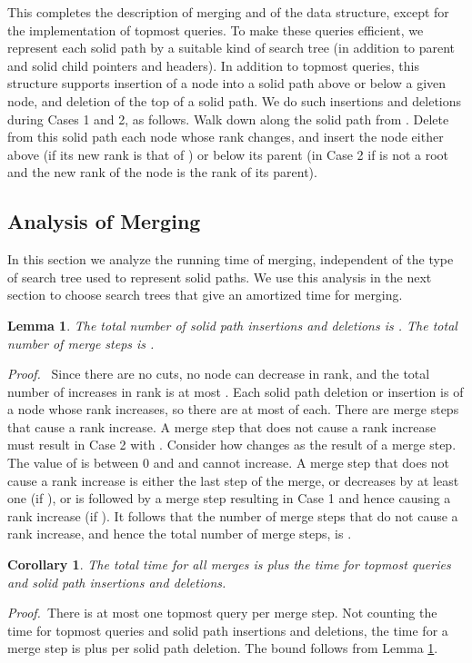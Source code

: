 \documentclass[twoside,leqno,twocolumn]{article}
\newtheorem{lemma}{Lemma}
\newtheorem{corollary}{Corollary}
\newcommand{\proof}{\noindent \emph{Proof.}\ }
\newcommand{\proofend}{\\}
\begin{document}
This completes the description of merging and of the data structure, except for the implementation of topmost queries.  To make these queries efficient, we represent each solid path by a suitable kind of search tree (in addition to parent and solid child pointers and headers).  In addition to topmost queries, this structure supports insertion of a node into a solid path above or below a given node, and deletion of the top of a solid path.  We do such insertions and deletions during Cases 1 and 2, as follows.  Walk down along the solid path from .  Delete from this solid path each node whose rank changes, and insert the node either above  (if its new rank is that of ) or below its parent (in Case 2 if  is not a root and the new rank of the node is the rank of its parent).




\subsection{Analysis of Merging}
\label{sec:merge-analysis}

In this section we analyze the running time of merging, independent of the type of search tree used to represent solid paths.  We use this analysis in the next section to choose search trees that give an  amortized time for merging.

\begin{lemma}
\label{lemma:number-of-steps} The total number of solid path insertions and deletions is .  The total number of merge steps is .
\end{lemma}
\proof
Since there are no cuts, no node can decrease in rank, and the total number of increases in rank is at most .  Each solid path deletion or insertion is of a node whose rank increases, so there are at most  of each.  There are  merge steps that cause a rank increase.  A merge step that does not cause a rank increase must result in Case 2 with .  Consider how  changes as the result of a merge step.  The value of  is between 0 and  and cannot increase.  A merge step that does not cause a rank increase is either the last step of the merge, or decreases  by at least one (if ), or is followed by a merge step resulting in Case 1 and hence causing a rank increase (if ).  It follows that the number of merge steps that do not cause a rank increase, and hence the total number of merge steps, is . \proofend


\begin{corollary}
\label{cor:number-of-steps} The total time for all merges is  plus the time for  topmost queries and  solid path insertions and deletions.
\end{corollary}
\proof There is at most one topmost query per merge step.  Not counting the time for topmost queries and solid path insertions and deletions, the time for a merge step is  plus  per solid path deletion.  The bound follows from Lemma \ref{lemma:number-of-steps}. \proofend
\end{document}
